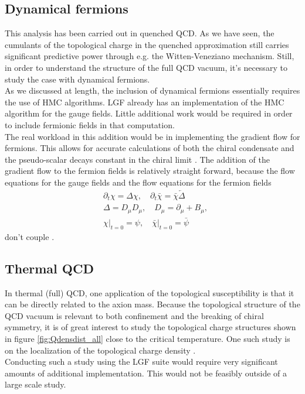 \documentclass[a4paper,10pt]{book}
\begin{document}
\subsection{Dynamical fermions}
This analysis has been carried out in quenched QCD. As we have seen, the cumulants of the topological charge in the quenched approximation still carries significant predictive power through e.g. the Witten-Veneziano mechanism. Still, in order to understand the structure of the full QCD vacuum, it's necessary to study the case with dynamical fermions.\\ As we discussed at length, the inclusion of dynamical fermions essentially requires the use of HMC algorithms. LGF already has an implementation of the HMC algorithm for the gauge fields. Little additional work would be required in order to include fermionic fields in that computation.\\The real workload in this addition would be in implementing the gradient flow for fermions. This allows for accurate calculations of both the chiral condensate and the pseudo-scalar decays constant in the chiral limit \cite{L_scher_2013}. The addition of the gradient flow to the fermion fields is relatively straight forward, because the flow equations for the gauge fields and the flow equations for the fermion fields 
\begin{equation}
\begin{aligned}
&\partial_{t} \chi=\Delta \chi, \quad \partial_{t} \bar{\chi}=\bar{\chi} \overleftarrow{\Delta}\\
&\Delta=D_{\mu} D_{\mu}, \quad D_{\mu}=\partial_{\mu}+B_{\mu},\\
&\left.\chi\right|_{t=0}=\psi,\left.\quad \bar{\chi}\right|_{t=0}=\bar{\psi}
\end{aligned}
\end{equation}
don't couple \cite{L_scher_2013}.
\subsection{Thermal QCD}
In thermal (full) QCD, one application of the topological susceptibility is that it can be directly related to the axion mass. Because the topological structure of the QCD vacuum is relevant to both confinement and the breaking of chiral symmetry, it is of great interest to study the topological charge structures shown in figure \ref{fig:Qdensdist_all} close to the critical temperature. One such study is on the localization of the topological charge density \cite{Zou_2018}.\\Conducting such a study using the LGF suite would require very significant amounts of additional implementation. This would not be feasibly outside of a large scale study.
\end{document}
